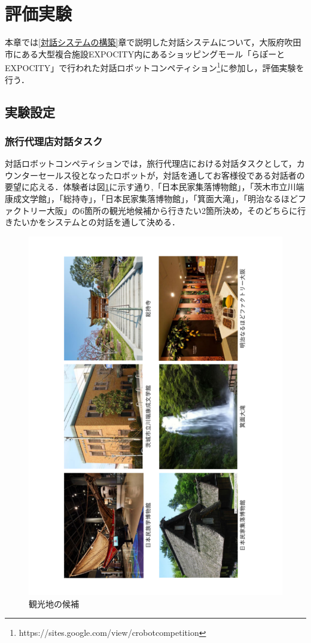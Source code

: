 \section{評価実験}
\label{評価実験}

本章では\ref{対話システムの構築}章で説明した対話システムについて，大阪府吹田市にある大型複合施設EXPOCITY内にあるショッピングモール「らぽーとEXPOCITY」で行われた対話ロボットコンペティション\footnote{https://sites.google.com/view/crobotcompetition}に参加し，評価実験を行う．

\subsection{実験設定}

\subsubsection{旅行代理店対話タスク}
対話ロボットコンペティションでは，旅行代理店における対話タスクとして，カウンターセールス役となったロボットが，対話を通してお客様役である対話者の要望に応える．体験者は図\ref{6place}に示す通り,「日本民家集落博物館」，「茨木市立川端康成文学館」，「総持寺」，「日本民家集落博物館」，「箕面大滝」，「明治なるほどファクトリー大阪」の6箇所の観光地候補から行きたい2箇所決め，そのどちらに行きたいかをシステムとの対話を通して決める．
\begin{figure}[th]
    \centering
    \includegraphics[scale=0.5,angle=270]{pic/6place.pdf}
    \caption{観光地の候補}
    \label{6place}
\end{figure}

